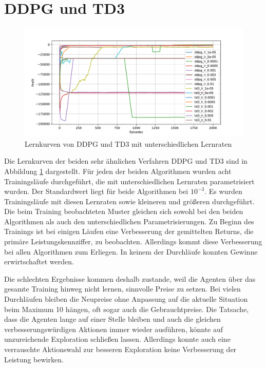 \section{DDPG und TD3}
\label{section:main_ddpg}
\begin{figure}[htb]
	\centering
	\includegraphics[width=\textwidth]{main/ddpg_td3.pdf}
	\caption{Lernkurven von DDPG und TD3 mit unterschiedlichen Lernraten}
	\label{graphic:DDPGLearningCurve}
\end{figure}

Die Lernkurven der beiden sehr ähnlichen Verfahren DDPG und TD3 sind in Abbildung \ref{graphic:DDPGLearningCurve} dargestellt.
Für jeden der beiden Algorithmen wurden acht Trainingsläufe durchgeführt, die mit unterschiedlichen Lernraten parametrisiert wurden.
Der Standardwert liegt für beide Algorithmen bei $10^{-3}$.
Es wurden Trainingsläufe mit diesen Lernraten sowie kleineren und größeren durchgeführt.
Die beim Training beobachteten Muster gleichen sich sowohl bei den beiden Algorithmen als auch den unterschiedlichen Parametrisierungen.
Zu Beginn des Trainings ist bei einigen Läufen eine Verbesserung der gemittelten Returns, die primäre Leistungskennziffer, zu beobachten.
Allerdings kommt diese Verbesserung bei allen Algorithmen zum Erliegen.
In keinem der Durchläufe konnten Gewinne erwirtschaftet werden.

Die schlechten Ergebnisse kommen deshalb zustande, weil die Agenten über das gesamte Training hinweg nicht lernen, sinnvolle Preise zu setzen.
Bei vielen Durchläufen bleiben die Neupreise ohne Anpassung auf die aktuelle Situation beim Maximum 10 hängen, oft sogar auch die Gebrauchtpreise.
Die Tatsache, dass die Agenten lange auf einer Stelle bleiben und auch die gleichen verbesserungswürdigen Aktionen immer wieder ausführen, könnte auf unzureichende Exploration schließen lassen.
Allerdings konnte auch eine verrauschte Aktionswahl zur besseren Exploration keine Verbesserung der Leistung bewirken.

